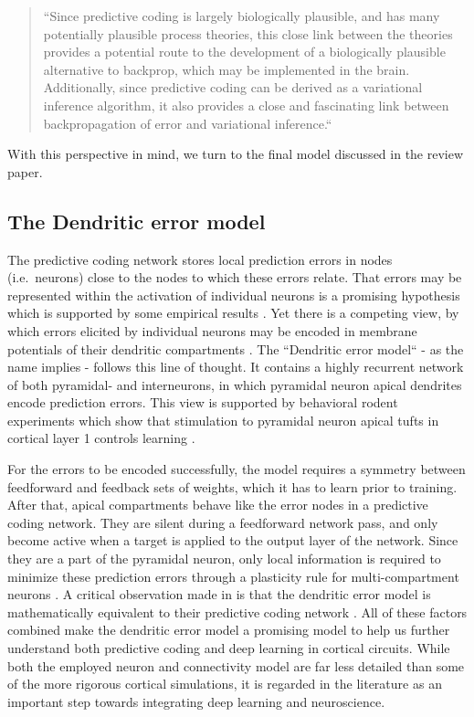 \begin{quotation}
  \noindent``Since predictive coding is largely biologically plausible, and has many potentially plausible process
  theories, this close link between the theories provides a potential route to the development of a biologically
  plausible alternative to backprop, which may be implemented in the brain. Additionally, since predictive coding can be
  derived as a variational inference algorithm, it also provides a close and fascinating link between backpropagation of
  error and variational inference.`` \citep{millidge2021predictive} \end{quotation}

\noindent With this perspective in mind, we turn to the final model discussed in the review paper.

\subsection{The Dendritic error model}

The predictive coding network stores local prediction errors in nodes (i.e.\ neurons) close to the nodes to which these
errors relate. That errors may be represented within the activation of individual neurons is a promising hypothesis which
is supported by some empirical results \citep{Hertaeg2022}. Yet there is a competing view, by which errors
elicited by individual neurons may be encoded in membrane potentials of their dendritic compartments
\citep{guerguiev2017towards}. The ``Dendritic error model`` \citep{sacramento2018dendritic} - as the name implies -
follows this line of thought. It contains a highly recurrent network of both pyramidal- and interneurons, in which
pyramidal neuron apical dendrites encode prediction errors. This view is supported by behavioral rodent experiments
which show that stimulation to pyramidal neuron apical tufts in cortical layer 1 controls learning \citep{Doron2020}.

For the errors to be encoded successfully, the model requires a symmetry between feedforward and feedback sets of
weights, which it has to learn prior to training. After that, apical compartments behave like the error nodes in a
predictive coding network. They are silent during a feedforward network pass, and only become active when a target is
applied to the output layer of the network. Since they are a part of the pyramidal neuron, only local information is
required to minimize these prediction errors through a plasticity rule for multi-compartment neurons
\citep{urbanczik2014learning}. A critical observation made in \citep{whittington2019theories} is that the dendritic
error model is mathematically equivalent to their predictive coding network . All of these factors combined make the dendritic error model a promising model to help us further
understand both predictive coding and deep learning in cortical circuits. While both the employed neuron and
connectivity model are far less detailed than some of the more rigorous cortical simulations, it is regarded in the
literature as an important step towards integrating deep learning and neuroscience\citep{Richards2019}.



